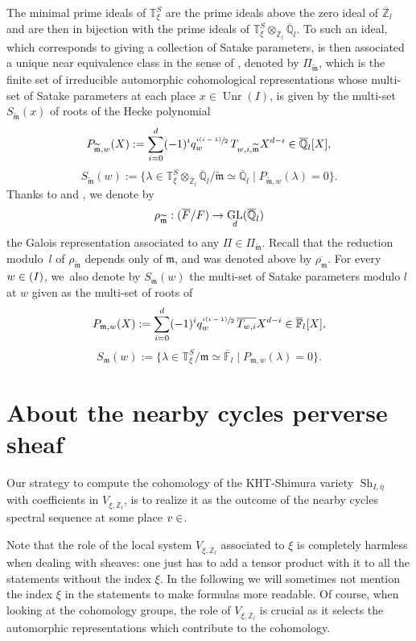 \documentclass[JEP,XML,SOM,Unicode,published]{cedram}
\newcommand{\NoChangel}[1]{%
\expandafter\let\csname old\string#1\endcsname=#1
\let#1=\relax
\newcommand{#1}{\mathcode`l="716C\csname old\string#1\endcsname\mathcode`l="7160 }%
}
\let\sep\mid
\DeclareMathOperator{\GL}{GL}
\theoremstyle{plain}
\theoremstyle{definition}
\numberwithin{equation}{subsection}
\newcommand\Tm{{\mathbb T}}
\newcommand\Fm{{\mathbb F}}
\newcommand\Qm{{\mathbb Q}}
\newcommand\Zm{{\mathbb Z}}
\DeclareMathOperator{\sh}{Sh}
\DeclareMathOperator{\gal}{Gal}\NoChangel{\gal}
\DeclareMathOperator{\spl}{Spl}\NoChangel{\spl}
\DeclareMathOperator{\unr}{Unr}
\begin{document}
The minimal prime ideals of $\Tm^S_{\xi}$ are the prime ideals above the zero ideal of
$\overline \Zm_l$ and are then in bijection with the prime ideals of
$\Tm^S_{\xi} \otimes_{\overline \Zm_l} \overline \Qm_l$.
To such an ideal, which corresponds
to giving a collection of Satake parameters, is then associated a unique near equivalence class in
the sense of \cite{y-t}, denoted by $\Pi_{\widetilde{\mathfrak m}}$, which is the finite set of
irreducible automorphic cohomological representations whose multi-set of Satake parameters
at each place $x \in \unr(I)$, is given by the multi-set $S_{\widetilde{\mathfrak m}}(x)$ of roots of
the Hecke polynomial
\[
P_{\widetilde{\mathfrak{m}},w}(X):=\sum_{i=0}^d(-1)^i q_w^{\sfrac{i(i-1)}{2}}\,
T_{w,i,\widetilde{\mathfrak m}} X^{d-i} \in \overline \Qm_l[X],
\]
\ie\[
S_{\widetilde{\mathfrak{m}}}(w) := \bigl \{\lambda \in \Tm^S_{\xi} \otimes_{\overline \Zm_l}
\overline \Qm_l / \widetilde{\mathfrak m} \simeq \overline \Qm_l \sep
P_{\widetilde{\mathfrak{m}},w}(\lambda)=0 \bigr\}.
\]
Thanks to \cite{h-t} and \cite{y-t}, we denote by
\[
\rho_{\widetilde{\mathfrak m}}:\gal(\overline F/F) \to \GL_d(\overline \Qm_l)
\]
the Galois representation associated to any $\Pi \in \Pi_{\widetilde{\mathfrak m}}$.
Recall that the reduction modulo~$l$ of $\rho_{\widetilde{\mathfrak m}}$ depends only
of $\mathfrak m$, and was denoted above by $\overline{\rho_{\mathfrak m}}$.
For every $w \in \spl(I)$, we~also denote by $S_{\mathfrak{m}}(w)$ the multi-set of Satake parameters modulo $l$ at $w$ given as the multi-set of roots of
\[
P_{\mathfrak{m},w}(X):=\sum_{i=0}^d(-1)^i q_w^{\sfrac{i(i-1)}{2}}\, \overline{T_{w,i}} X^{d-i}
\in \overline \Fm_l[X],
\]
\ie\[
S_{\mathfrak{m}}(w) := \bigl \{\lambda \in \Tm^S_\xi/\mathfrak m \simeq \overline \Fm_l
\sep P_{\mathfrak{m},w}(\lambda)=0 \bigr\}.
\]

\section{About the nearby cycles perverse sheaf}

Our strategy to compute the cohomology of the KHT-Shimura variety $\sh_{I,\bar \eta}$ with
coefficients in $V_{\xi,\overline \Zm_l}$, is to realize it as the outcome of the nearby cycles
spectral sequence at some place $v \in \spl$.

Note that the role of the local system $V_{\xi,\overline \Zm_l}$
associated to $\xi$ is completely harmless when
dealing with sheaves: one just has to add a tensor product with it to all the
statements without the index $\xi$. In the following we will sometimes not mention the index
$\xi$ in the statements to make formulas more readable. Of course, when looking at the
cohomology groups, the role of $V_{\xi,\overline \Zm_l}$ is crucial as it selects the
automorphic representations which contribute to the cohomology.
\end{document}
